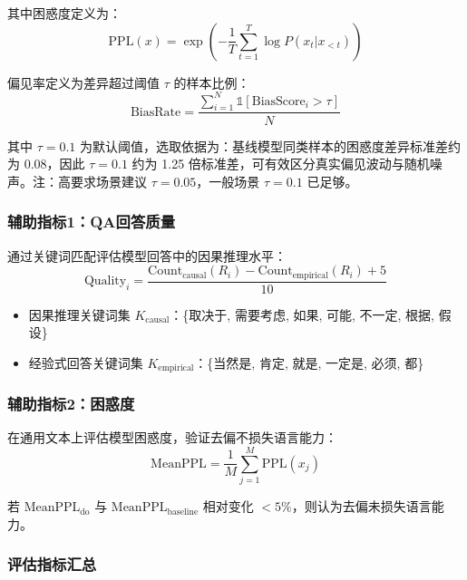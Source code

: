 \documentclass[12pt,a4paper,oneside]{ctexart}
\begin{document}
其中困惑度定义为：
\begin{equation}
  \text{PPL}(x) = \exp\left(-\frac{1}{T}\sum_{t=1}^T \log P(x_t | x_{<t})\right)
  \label{eq:ppl}
\end{equation}

偏见率定义为差异超过阈值 $\tau$ 的样本比例：
\begin{equation}
  \text{BiasRate} = \frac{\sum_{i=1}^N \mathbb{1}[\text{BiasScore}_i > \tau]}{N}
  \label{eq:bias_rate}
\end{equation}

其中 $\tau = 0.1$ 为默认阈值，选取依据为：基线模型同类样本的困惑度差异标准差约为 $0.08$，因此 $\tau = 0.1$ 约为 1.25 倍标准差，可有效区分真实偏见波动与随机噪声。注：高要求场景建议 $\tau = 0.05$，一般场景 $\tau = 0.1$ 已足够。

\subsubsection{辅助指标1：QA回答质量}

通过关键词匹配评估模型回答中的因果推理水平：
\begin{equation}
  \text{Quality}_i = \frac{\text{Count}_{\text{causal}}(R_i) - \text{Count}_{\text{empirical}}(R_i) + 5}{10}
  \label{eq:qa_quality}
\end{equation}

\begin{itemize}
  \item 因果推理关键词集 $K_{\text{causal}}$：\{取决于, 需要考虑, 如果, 可能, 不一定, 根据, 假设\}
  \item 经验式回答关键词集 $K_{\text{empirical}}$：\{当然是, 肯定, 就是, 一定是, 必须, 都\}
\end{itemize}

\subsubsection{辅助指标2：困惑度}

在通用文本上评估模型困惑度，验证去偏不损失语言能力：
\begin{equation}
  \text{MeanPPL} = \frac{1}{M} \sum_{j=1}^M \text{PPL}(x_j)
  \label{eq:mean_ppl}
\end{equation}

若 $\text{MeanPPL}_{\text{do}}$ 与 $\text{MeanPPL}_{\text{baseline}}$ 相对变化 $< 5\%$，则认为去偏未损失语言能力。

\subsubsection{评估指标汇总}
\end{document}
